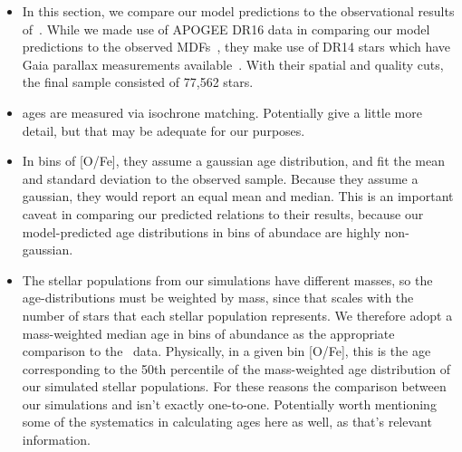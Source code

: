 \documentclass[fleqn, usenatbib]{mnras}
\begin{document}
\begin{itemize} 
	\item In this section, we compare our model predictions to the 
	observational results of~\citet{Feuillet2019}. While we made use of 
	APOGEE DR16 data in comparing our model predictions to the observed 
	MDFs~\citep{Ahumada2020, Majewski2017}, they make use of DR14 stars which 
	have Gaia parallax measurements available~\citep[][for details on the 
	APOGEE survey, see discussion in~\S~\ref{sec:mdfs}]{Abolfathi2014, 
	GaiaDR2}. With their spatial and quality cuts, the final sample consisted 
	of 77,562 stars. 

	\item \citet{Feuillet2019} ages are measured via isochrone matching. 
	{\color{red} Potentially give a little more detail, but that may be 
	adequate for our purposes.} 

	\item In bins of [O/Fe], they assume a gaussian age distribution, and fit 
	the mean and standard deviation to the observed sample. Because they 
	assume a gaussian, they would report an equal mean and median. This is an 
	important caveat in comparing our predicted relations to their results, 
	because our model-predicted age distributions in bins of abundace are 
	highly non-gaussian. 

	\item The stellar populations from our simulations have different masses, 
	so the age-distributions must be weighted by mass, since that scales with 
	the number of stars that each stellar population represents. We therefore 
	adopt a mass-weighted median age in bins of abundance as the appropriate 
	comparison to the~\citet{Feuillet2019} data. Physically, in a given bin 
	[O/Fe], this is the age corresponding to the 50th percentile of the 
	mass-weighted age distribution of our simulated stellar populations. For 
	these reasons the comparison between our simulations and 
	\citet{Feuillet2019} isn't exactly one-to-one. {\color{red} Potentially 
	worth mentioning some of the systematics in calculating ages here as 
	well, as that's relevant information.} 
\end{itemize}
\end{document}

